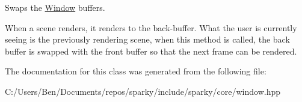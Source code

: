 Swaps the \hyperlink{classsparky_1_1_window}{Window} buffers. 

When a scene renders, it renders to the back-\/buffer. What the user is currently seeing is the previously rendering scene, when this method is called, the back buffer is swapped with the front buffer so that the next frame can be rendered. 

The documentation for this class was generated from the following file\+:\begin{DoxyCompactItemize}
\item 
C\+:/\+Users/\+Ben/\+Documents/repos/sparky/include/sparky/core/window.\+hpp\end{DoxyCompactItemize}
